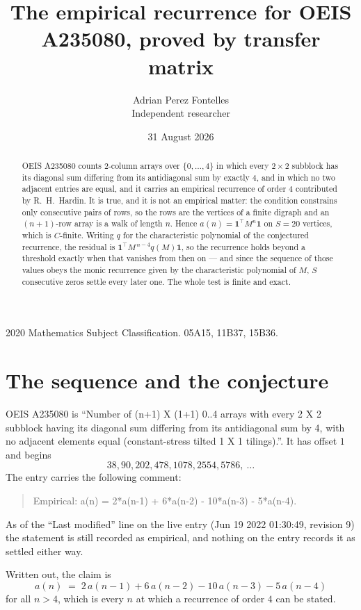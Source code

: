 \documentclass[11pt,a4paper]{article}
\title{The empirical recurrence for OEIS A235080, proved by transfer matrix}
\author{Adrian Perez Fontelles\\ \small Independent researcher}
\date{31 August 2026}
\theoremstyle{plain}
\theoremstyle{definition}
\begin{document}
\maketitle

\begin{abstract}
OEIS A235080 counts $2$-column arrays over $\{0,\dots,4\}$ in which every
$2\times2$ subblock has its diagonal sum differing from its antidiagonal sum by
exactly $4$, and in which no two adjacent entries are equal, and it
carries an empirical recurrence of order $4$ contributed by R.~H.~Hardin. It is true,
and it is not an empirical matter: the condition constrains only consecutive pairs of rows,
so the rows are the vertices of a finite digraph and an $(n+1)$-row array is a walk of
length $n$. Hence $a(n)=\mathbf{1}^{\!\top}M^{n}\mathbf{1}$ on $S=20$ vertices, which
is $C$-finite. Writing $q$ for the characteristic polynomial of the conjectured recurrence,
the residual is $\mathbf{1}^{\!\top}M^{\,n-4}q(M)\mathbf{1}$, so the recurrence
holds beyond a threshold exactly when that vanishes from then on --- and since the sequence
of those values obeys the monic recurrence given by the characteristic polynomial of $M$,
$S$ consecutive zeros settle every later one. The whole test is finite and exact.
\end{abstract}

\noindent\small 2020 Mathematics Subject Classification. 05A15, 11B37, 15B36.\normalsize

\section{The sequence and the conjecture}

OEIS A235080 is ``Number of (n+1) X (1+1) 0..4 arrays with every 2 X 2 subblock having its diagonal sum differing from its antidiagonal sum by 4, with no adjacent elements equal (constant-stress tilted 1 X 1 tilings).''. It has offset
$1$ and begins
\[
38, 90, 202, 478, 1078, 2554, 5786,\ \dots
\]
The entry carries the following comment:
\begin{quote}\small
Empirical: a(n) = 2*a(n-1) + 6*a(n-2) - 10*a(n-3) - 5*a(n-4).
\end{quote}
As of the ``Last modified'' line on the live entry (Jun 19 2022 01:30:49, revision 9) the statement is
still recorded as empirical, and nothing on the entry records it as settled either way.

Written out, the claim is
\begin{equation}\label{eq:conj}
a(n)\;=\;2\,a(n-1) + 6\,a(n-2) - 10\,a(n-3) - 5\,a(n-4)
\end{equation}
for all $n>4$, which is every $n$ at which a recurrence of order $4$ can be
stated.
\end{document}
